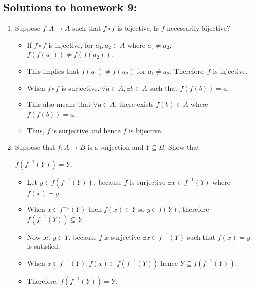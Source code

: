 \documentclass[letterpaper,12pt]{article}
\begin{document}
\subsection*{Solutions to homework 9:}

\begin{enumerate}
\item Suppose $f :A \rightarrow A$ such that $f \circ f$ is bijective. Is $f$ necessarily bijective?
\begin{itemize}
	\item If $f \circ f$ is injective, for $a_1,a_2 \in A $ where $a_1 \neq a_2$, $f(f(a_1)) \neq f(f(a_2))$.
	\item This implies that $f(a_1) \neq f(a_2)$ for $a_1 \neq a_2$. Therefore, $f$ is injective.
	\item When $f \circ f$ is surjective. $\forall a \in A,\exists b\in A$ such that $f(f(b)) = a$.
	\item This also means that $\forall a \in A$, there exists $f(b) \in A$ where $f(f(b)) = a$.
	\item Thus, $f$ is surjective and hence $f $ is bijective.
\end{itemize}

\item Suppose that $f:A \rightarrow B$ is a surjection and $ Y \subseteq B$. Show that 
\begin{center}
	$f(f^{-1}(Y))=Y$.
\end{center}
\begin{itemize}
	\item Let $y \in f(f^{-1}(Y)),$ because $f$ is surjective $\exists x \in f^{-1}(Y)$ where $f(x) = y$.
	\item When $x \in f^{-1}(Y)$ then $f(x) \in Y$ so $y \in f(Y)$, therefore $f(f^{-1}(Y)) \subseteq Y$.
	\item Now let $y \in Y$, because $f$ is surjective $\exists x \in f^{-1}(Y)$ such that $f(x) = y$ is satisfied.
	\item When $x \in f^{-1}(Y),f(x) \in f(f^{-1}(Y))$ hence $Y \subseteq f(f^{-1}(Y)).$
	\item Therefore, $f(f^{-1}(Y)) = Y$.
\end{itemize}


\end{enumerate}
\end{document}
